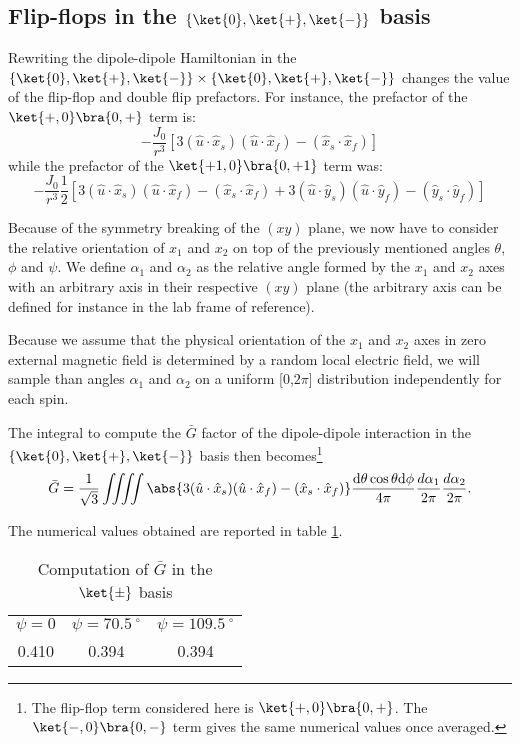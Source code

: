 \documentclass[a4paper,11pt]{report}
\begin{document}
\subsection{Flip-flops in the $\{ \ket{0}, \ket{+}, \ket{-}\}$ basis}
\label{sec flip-flop +/-}
Rewriting the dipole-dipole Hamiltonian in the $\{ \ket{0}, \ket{+}, \ket{-}\} \times \{ \ket{0}, \ket{+}, \ket{-}\}$ changes the value of the flip-flop and double flip prefactors. For instance, the prefactor of the $\ket{+,0}\bra{0,+}$ term is: \begin{equation}
-\frac{J_0}{r^3}\left[3(\hat{u}\cdot\hat{x}_s)(\hat{u}\cdot\hat{x}_f) - (\hat{x}_s \cdot \hat{x}_f)\right]
\end{equation}
while the prefactor of the $\ket{+1,0}\bra{0,+1}$ term was: \begin{equation}
-\frac{J_0}{r^3}\frac{1}{2}\left[3(\hat{u}\cdot\hat{x}_s)(\hat{u}\cdot\hat{x}_f) - (\hat{x}_s \cdot \hat{x}_f) + 3(\hat{u}\cdot\hat{y}_s)(\hat{u}\cdot\hat{y}_f) - (\hat{y}_s \cdot \hat{y}_f) \right] 
\end{equation}

Because of the symmetry breaking of the $(xy)$ plane, we now have to consider the relative orientation of $x_1$ and $x_2$ on top of the previously mentioned angles $\theta$, $\phi$ and $\psi$. We define $\alpha_1$ and $\alpha_2$ as the relative angle formed by the $x_1$ and $x_2$ axes with an arbitrary axis in their respective $(xy)$ plane (the arbitrary axis can be defined for instance in the lab frame of reference). 

Because we assume that the physical orientation of the $x_1$ and $x_2$ axes in zero external magnetic field is determined by a random local electric field, we will sample than angles $\alpha_1$ and $\alpha_2$ on a uniform [0,$2\pi$] distribution independently for each spin.

The integral to compute the $\bar G$ factor of the dipole-dipole interaction in the $\{ \ket{0}, \ket{+}, \ket{-}\}$ basis then becomes\footnote{The flip-flop term considered here is $\ket{+,0}\bra{0,+}$. The $\ket{-,0}\bra{0,-}$ term gives the same numerical values once averaged.}
\begin{equation}
\bar G= \frac{1}{\sqrt{3}} \iiiint \abs{3(\hat{u}\cdot\hat{x}_s)(\hat{u}\cdot\hat{x}_f) - (\hat{x}_s \cdot \hat{x}_f)} \frac{\rm d\theta \cos \theta \rm d\phi}{4 \pi} \frac{d \alpha_1}{2\pi} \frac{d \alpha_2}{2\pi}.
\end{equation}

The numerical values obtained are reported in table \ref{table G flip-flop non mag}.
\begin{table}[htbp]
\centering
\caption{Computation of $\bar G$ in the $\ket{\pm}$ basis}
 \label{table G flip-flop non mag}
\begin{tabular}{c|c|c}
\toprule
$\psi=0$ & $\psi=70.5 \ ^\circ$ & $\psi=109.5 \ ^\circ$ \\

0.410 & 0.394 & 0.394 \\
\bottomrule
\end{tabular}
\end{table}
\end{document}
